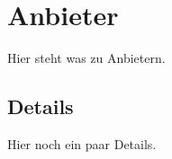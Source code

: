 \section{Anbieter}
\begin{frame}
Hier steht was zu Anbietern.
\end{frame}

\subsection{Details}
\begin{frame}
Hier noch ein paar Details.
\end{frame}